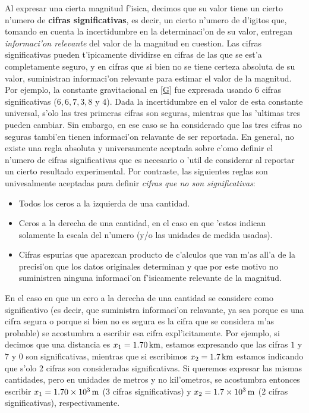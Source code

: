 \documentclass[a4paper]{report}
\begin{document}
Al expresar una cierta magnitud f'isica, decimos que su valor tiene un cierto n'umero de \textbf{cifras significativas}, es decir, un cierto n'umero de d'igitos que, tomando en cuenta la incertidumbre en la determinaci'on de su valor, entregan \textit{informaci'on relevante} del valor de la magnitud en cuestion. Las cifras significativas pueden t'ipicamente dividirse en cifras de las que se est'a completamente seguro, y en cifras que si bien no se tiene certeza absoluta de su valor, suministran informaci'on relevante para estimar el valor de la magnitud. Por ejemplo, la constante gravitacional en \eqref{G} fue expresada usando 6 cifras significativas ($6, 6, 7, 3, 8$ y $4$). Dada la incertidumbre en el valor de esta constante universal, s'olo las tres primeras cifras son seguras, mientras que las 'ultimas tres pueden cambiar. Sin embargo, en ese caso se ha considerado que las tres cifras no seguras tambi'en tienen informaci'on relavante de ser reportada. En general, no existe una regla absoluta y universamente aceptada sobre c'omo definir el n'umero de cifras significativas que es necesario o 'util de considerar al reportar un cierto resultado experimental. Por contraste, las siguientes reglas son univesalmente aceptadas para definir \textit{cifras que no son significativas}:
\begin{itemize}
\item Todos los ceros a la izquierda de una cantidad.
\item Ceros a la derecha de una cantidad, en el caso en que 'estos indican solamente la escala del n'umero (y/o las unidades de medida usadas).
\item Cifras espurias que aparezcan producto de c'alculos que van m'as all'a de la precisi'on que los datos originales determinan y que por este motivo no suministren ninguna informaci'on f'isicamente relevante de la magnitud.
\end{itemize}

En el caso en que un cero a la derecha de una cantidad se considere como significativo (es decir, que suministra informaci'on relavante, ya sea porque es una cifra segura o porque si bien no es segura es la cifra que se considera m'as probable) se acostumbra a escribir esa cifra expl'icitamente. Por ejemplo, si decimos que una distancia es $x_1=1.70{\rm\, km}$, estamos expresando que las cifras $1$ y $7$ y $0$ son significativas, mientras que si escribimos $x_2=1.7{\rm\, km}$ estamos indicando que s'olo 2 cifras son consideradas significativas. Si queremos expresar las mismas cantidades, pero en unidades de metros y no kil'ometros, se acostumbra entonces escribir $x_1=1.70\times 10^3{\rm\, m}$ (3 cifras significativas) y $x_2=1.7\times 10^3{\rm\, m}$ (2 cifras significativas), respectivamente.
\end{document}
